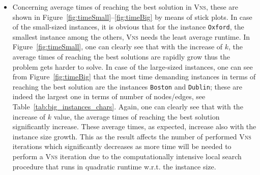 \documentclass[dvipsnames,format=sigconf,anonymous=true,review=true]{acmart}
\begin{document}
\begin{itemize}
   		\item Concerning average times of reaching the best solution in \textsc{Vns}, these are shown in Figure~\ref{fig:timeSmall}--\ref{fig:timeBig} by means of stick plots.  In case of the small-sized instances, it is obvious that for the instance \texttt{Oxford},  the smallest instance among the others, \textsc{Vns} needs the least average runtime.  In Figure~\ref{fig:timeSmall}, one can clearly see that with the increase of $k$, the average times of reaching the best solutions are rapidly grow thus the problem gets harder to solve. In case of the large-sized instances, one can see  from  Figure~\ref{fig:timeBig} that the most time demanding instances in terms of reaching the best solution are the instances \texttt{Boston} and \texttt{Dublin}; these are indeed the largest one in terms of number of nodes/edges, see Table~\ref{tab:big_instances_chars}. Again, one can clearly see that with the increase of $k$ value, the average times of reaching the best solution significantly increase. These  average times, as expected, increase also with the instance size growth. This as the result affects the number of performed \textsc{Vns} iterations which significantly decreases as more time will be needed to perform a \textsc{Vns} iteration due to the   computationally intensive local search procedure that runs in quadratic runtime w.r.t. the instance size.
   \end{itemize}
 

 
 
\end{document}
